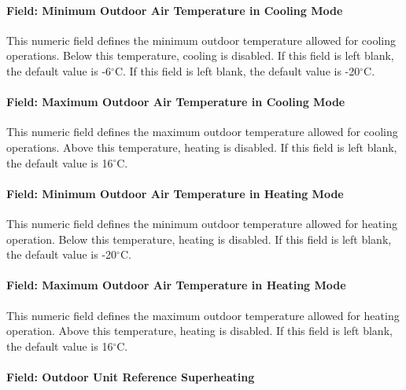 \paragraph{Field: Minimum Outdoor Air Temperature in Cooling Mode}\label{field-minimum-outdoor-air-temperature-in-cooling-mode}

This numeric field defines the minimum outdoor temperature allowed for cooling operations. Below this temperature, cooling is disabled. If this field is left blank, the default value is -6$^\circ$C.
 If this field is left blank, the default value is -20$^\circ$C.

\paragraph{Field: Maximum Outdoor Air Temperature in Cooling Mode}\label{field-maximum-outdoor-air-temperature-in-cooling-mode}

This numeric field defines the maximum outdoor temperature allowed for cooling operations. Above this temperature, heating is disabled. If this field is left blank, the default value is 16$^\circ$C.

\paragraph{Field: Minimum Outdoor Air Temperature in Heating Mode}\label{field-minimum-outdoor-air-temperature-in-heating-mode}

This numeric field defines the minimum outdoor temperature allowed for heating operation. Below this temperature, heating is disabled. If this field is left blank, the default value is -20$^\circ$C.

\paragraph{Field: Maximum Outdoor Air Temperature in Heating Mode}\label{field-maximum-outdoor-air-temperature-in-heating-mode}

This numeric field defines the maximum outdoor temperature allowed for heating operation. Above this temperature, heating is disabled. If this field is left blank, the default value is 16$^\circ$C.

\paragraph{Field: Outdoor Unit Reference Superheating}\label{field-outdoor-unit-reference-superheating}

